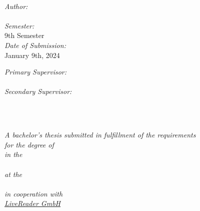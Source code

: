 \documentclass[
11pt, %
english, %
singlespacing, %
headsepline, %
]{MastersDoctoralThesis} %
\author{Jason Rietzke} %
\begin{document}
\frontmatter %

\pagestyle{plain} %


\begin{titlepage}
	\begin{center}
		{\huge \bfseries \ttitle\par}\vspace{0.4cm}
		\HRule \\[1.5cm]

		\begin{minipage}[t]{0.4\textwidth}
		\begin{flushleft} \large
		\emph{Author:}\\
		\authorname\\[0.3cm]
		\emph{Semester:}\\
		{9th Semester}\\[0.3cm]
		\emph{Date of Submission:}\\
		{January 9th, 2024}\\[0.3cm]

		\end{flushleft}
		\end{minipage}
		\begin{minipage}[t]{0.5\textwidth}
		\begin{flushright} \large
		\emph{Primary Supervisor:} \\
		\psupname\\[0.3cm]
		\emph{Secondary Supervisor:} \\
		\ssupname\\
		\end{flushright}
		\end{minipage}\\[3cm]
		
		\vfill

		\large\textit{
			A bachelor's thesis submitted in fulfillment of the requirements\\ for the degree of \degreename
		}\\[0.3cm]
		\large\textit{in the}\\[0.4cm]
		\large\textit\deptname\\[0.4cm]
		\large\textit{at the}\\[0.4cm]
		\large\textit\univname\\[0.4cm]
		\large\textit{in cooperation with}\\[0.4cm]
		\large\textit{\href{https://livereader.com/}{LiveReader GmbH}}\\[2cm]

		\vfill
	\end{center}
\end{titlepage}
\end{document}
